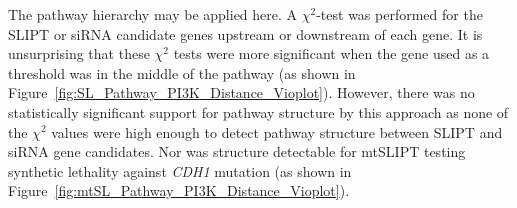 


\begin{table*}[!htbp]
\caption{ANOVA for Synthetic Lethality and PI3K Hierarchy}
\label{tab:SL_Pathway_PI3K_Distance_Counts}
\noindent{}
\end{table*}
The pathway hierarchy may be applied here. A $\chi^2$-test was performed for the \gls{SLIPT} or \gls{siRNA} candidate genes upstream or downstream of each gene. It is unsurprising that these $\chi^2$ tests were more significant when the gene used as a threshold was in the middle of the pathway (as shown in Figure~\ref{fig:SL_Pathway_PI3K_Distance_Vioplot}). However, there was no statistically significant support for pathway structure by this approach as none of the $\chi^2$ values were high enough to detect pathway structure between \gls{SLIPT} and \gls{siRNA} gene candidates. Nor was structure detectable for mtSLIPT testing synthetic lethality against \textit{CDH1} mutation (as shown in Figure~\ref{fig:mtSL_Pathway_PI3K_Distance_Vioplot}).


